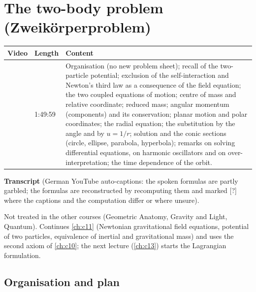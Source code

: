 \chapter{The two-body problem (Zweik\"orperproblem)}\label{ch:c12}
\begin{paracol}{2}

\begin{sources}
\begin{tabularx}{\linewidth}{@{}l l L@{}}
\toprule
\textbf{Video} & \textbf{Length} & \textbf{Content}\\
\midrule
{} & 1:49:59 & Organisation (no new problem sheet); recall of the two-particle potential; exclusion of the self-interaction and Newton's third law as a consequence of the field equation; the two coupled equations of motion; centre of mass and relative coordinate; reduced mass; angular momentum (components) and its conservation; planar motion and polar coordinates; the radial equation; the substitution by the angle and by $u=1/r$; solution and the conic sections (circle, ellipse, parabola, hyperbola); remarks on solving differential equations, on harmonic oscillators and on over-interpretation; the time dependence of the orbit.\\
\bottomrule
\end{tabularx}

\smallskip
\textbf{Transcript}  (German YouTube auto-captions: the spoken formulas are partly garbled; the formulas are reconstructed by recomputing them and marked [?] where the captions and the computation differ or where unsure).
\end{sources}

\begin{reading}
Not treated in the other courses (Geometric Anatomy, Gravity and Light, Quantum).
Continues \cref{ch:c11} (Newtonian gravitational field equations, potential of two particles, equivalence of inertial and gravitational mass) and uses the second axiom of \cref{ch:c10};
the next lecture (\cref{ch:c13}) starts the Lagrangian formulation.
\end{reading}

\section{Organisation and plan}\label{sec:tb-org}


\end{paracol}
